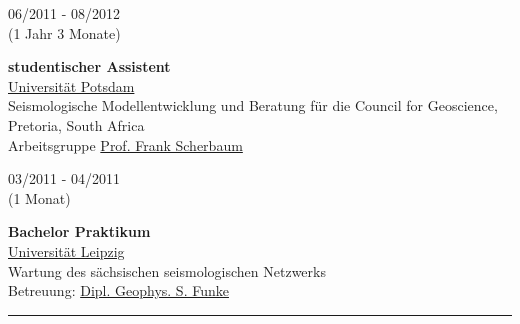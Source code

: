 \documentclass{article}
\begin{document}
\begin{minipage}[t]{0.67\textwidth}
\begin{minipage}{0.49\textwidth}
		\vspace{0.5cm}
		
		\begin{minipage}[t]{0.25\textwidth}
		06/2011 - 08/2012 \\ (1 Jahr 3 Monate)
		\end{minipage}
		\hfill
		\begin{minipage}[t]{0.75\textwidth}
		\textbf{studentischer Assistent}\\
		\href{https://www.uni-potsdam.de/}{\color{pblue}Universität Potsdam}\\
	    Seismologische Modellentwicklung und Beratung für die Council for Geoscience, Pretoria, South Africa\\ Arbeitsgruppe \href{http://www.geo.uni-potsdam.de/mitarbeiterdetails/show/96/Frank_Scherbaum.html/}{\color{pblue}Prof. Frank Scherbaum}%
		\end{minipage}
		
		\vspace{0.5cm}
		
		\begin{minipage}[t]{0.25\textwidth}
		03/2011 - 04/2011 \\ (1 Monat)
		\end{minipage}		
		\hfill
		\begin{minipage}[t]{0.75\textwidth}
		\textbf{Bachelor Praktikum}\\
		\href{http://geologie.physgeo.uni-leipzig.de}{\color{pblue}Universität Leipzig}\\
	    Wartung des sächsischen seismologischen Netzwerks\\ Betreuung: \href{mailto:sfunke@rz.uni-leipzig.de}{Dipl. Geophys. S. Funke}
		\end{minipage}
		
		\vspace{0.5cm}
		
		\end{minipage}
		\hrule

\end{minipage}
\end{document}
